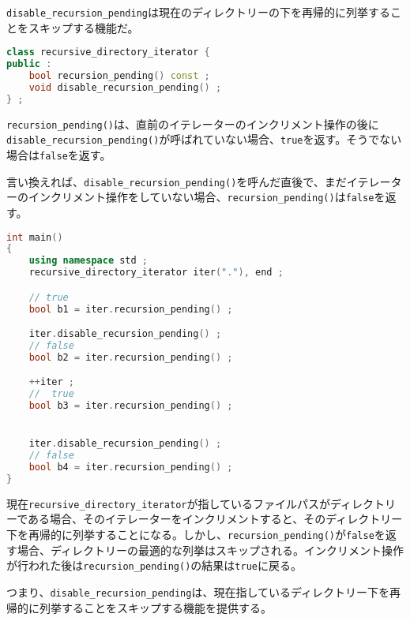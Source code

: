 \lstinline!disable_recursion_pending!は現在のディレクトリーの下を再帰的に列挙することをスキップする機能だ。

\begin{lstlisting}[language=C++]
class recursive_directory_iterator {
public :
    bool recursion_pending() const ;
    void disable_recursion_pending() ;
} ;
\end{lstlisting}

\lstinline!recursion_pending()!は、直前のイテレーターのインクリメント操作の後に\lstinline!disable_recursion_pending()!が呼ばれていない場合、\lstinline!true!を返す。そうでない場合は\lstinline!false!を返す。

言い換えれば、\lstinline!disable_recursion_pending()!を呼んだ直後で、まだイテレーターのインクリメント操作をしていない場合、\lstinline!recursion_pending()!は\lstinline!false!を返す。

\begin{lstlisting}[language=C++]
int main()
{
    using namespace std ;
    recursive_directory_iterator iter("."), end ;

    // true
    bool b1 = iter.recursion_pending() ;

    iter.disable_recursion_pending() ;
    // false
    bool b2 = iter.recursion_pending() ;

    ++iter ;
    //  true
    bool b3 = iter.recursion_pending() ;


    iter.disable_recursion_pending() ;
    // false
    bool b4 = iter.recursion_pending() ;
}
\end{lstlisting}

現在\lstinline!recursive_directory_iterator!が指しているファイルパスがディレクトリーである場合、そのイテレーターをインクリメントすると、そのディレクトリー下を再帰的に列挙することになる。しかし、\lstinline!recursion_pending()!が\lstinline!false!を返す場合、ディレクトリーの最適的な列挙はスキップされる。インクリメント操作が行われた後は\lstinline!recursion_pending()!の結果は\lstinline!true!に戻る。

つまり、\lstinline!disable_recursion_pending!は、現在指しているディレクトリー下を再帰的に列挙することをスキップする機能を提供する。

